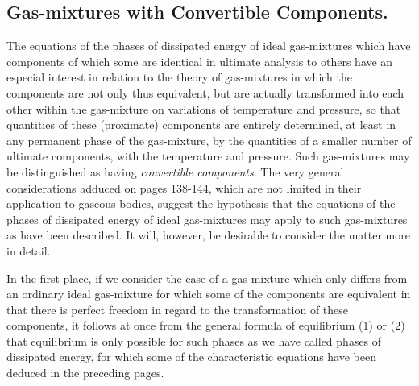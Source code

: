 \documentclass[12pt]{memoir}
\begin{document}

\subsection{Gas-mixtures with Convertible Components.}
The equations of the phases of dissipated energy of ideal gas-mixtures which have components of which some are identical in ultimate analysis to others have an especial interest in relation to the theory of gas-mixtures in which the components are not only thus equivalent, but are actually transformed into each other within the gas-mixture on variations of temperature and pressure, so that quantities of these (proximate) components are entirely determined, at least in any permanent phase of the gas-mixture, by the quantities of a smaller number of ultimate components, with the temperature and pressure. Such gas-mixtures may be distinguished as having \textit{convertible components}. The very general considerations adduced on pages 138-144, which are not limited in their application to gaseous bodies, suggest the hypothesis that the equations of the phases of dissipated energy of ideal gas-mixtures may apply to such gas-mixtures as have been described. It will, however, be desirable to consider the matter more in detail.


In the first place, if we consider the case of a gas-mixture which only differs from an ordinary ideal gas-mixture for which some of the components are equivalent in that there is perfect freedom in regard to the transformation of these components, it follows at once from the general formula of equilibrium (1) or (2) that equilibrium is only possible for such phases as we have called phases of dissipated energy, for which some of the characteristic equations have been deduced in the preceding pages.
\end{document}
